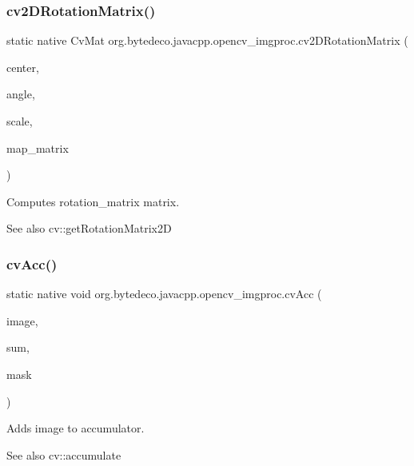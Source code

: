 \subsubsection{\texorpdfstring{cv2\+D\+Rotation\+Matrix()}{cv2DRotationMatrix()}}
{\footnotesize\ttfamily static native Cv\+Mat org.\+bytedeco.\+javacpp.\+opencv\+\_\+imgproc.\+cv2\+D\+Rotation\+Matrix (\begin{DoxyParamCaption}\item[{@By\+Val Cv\+Point2\+D32f}]{center,  }\item[{double}]{angle,  }\item[{double}]{scale,  }\item[{Cv\+Mat}]{map\+\_\+matrix }\end{DoxyParamCaption})\hspace{0.3cm}{\ttfamily [static]}}



Computes rotation\+\_\+matrix matrix. 

\begin{DoxySeeAlso}{See also}
cv\+::get\+Rotation\+Matrix2D 
\end{DoxySeeAlso}
\mbox{\label{group__imgproc__c_ga59fe63bcfa209c1ced0035aca7d47f26}} 
\subsubsection{\texorpdfstring{cv\+Acc()}{cvAcc()}}
{\footnotesize\ttfamily static native void org.\+bytedeco.\+javacpp.\+opencv\+\_\+imgproc.\+cv\+Acc (\begin{DoxyParamCaption}\item[{@Const Cv\+Arr}]{image,  }\item[{Cv\+Arr}]{sum,  }\item[{@Const Cv\+Arr}]{mask }\end{DoxyParamCaption})\hspace{0.3cm}{\ttfamily [static]}}



Adds image to accumulator. 

\begin{DoxySeeAlso}{See also}
cv\+::accumulate 
\end{DoxySeeAlso}
\mbox{\label{group__imgproc__c_ga3b50e19183ae4a5f9915eb3a30aab0fc}} 
